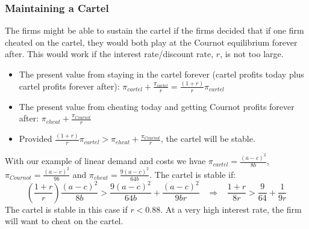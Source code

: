 \documentclass{article}
\begin{document}
\subsubsection*{Maintaining a Cartel}
The firms might be able to sustain the cartel if the firms decided that if one firm cheated on the cartel, they would both play at the Cournot equilibrium forever after. This would work if the interest rate/discount rate, $r$, is not too large.
\begin{itemize}
  \item The present value from staying in the cartel forever (cartel profits today plus cartel profits forever after): $\pi_{cartel}+\frac{\pi_{cartel}}{r}= \frac{\left( 1+r \right)}{r}\pi_{cartel}$
  \item The present value from cheating today and getting Cournot profits forever after:
    $\pi_{cheat}+\frac{\pi_{Cournot}}{r}$
  \item Provided $\frac{\left( 1+r \right)}{r}\pi_{cartel}> \pi_{cheat}+\frac{\pi_{Cournot}}{r}$, the cartel will be stable.
\end{itemize}
With our example of linear demand and costs we hvae $\pi_{cartel}=\frac{\left( a-c \right)^2}{8b}$, $\pi_{Cournot}=\frac{\left( a-c \right)^2}{9b}$ and $\pi_{cheat}=\frac{9\left( a-c \right)^2}{64b}$. The cartel is stable if:
\[\left( \frac{1+r}{r} \right)\frac{\left( a-c \right)^2}{8b} > \frac{9\left( a-c \right)^2}{64b} +\frac{\left( a-c \right)^2}{9br}\;\;\; \Longrightarrow \;\;\; \frac{1+r}{8r}>\frac{9}{64}+\frac{1}{9r}
\]
The cartel is stable in this case if $r<0.88$. At a very high interest rate, the firm will want to cheat on the cartel.
\end{document}
